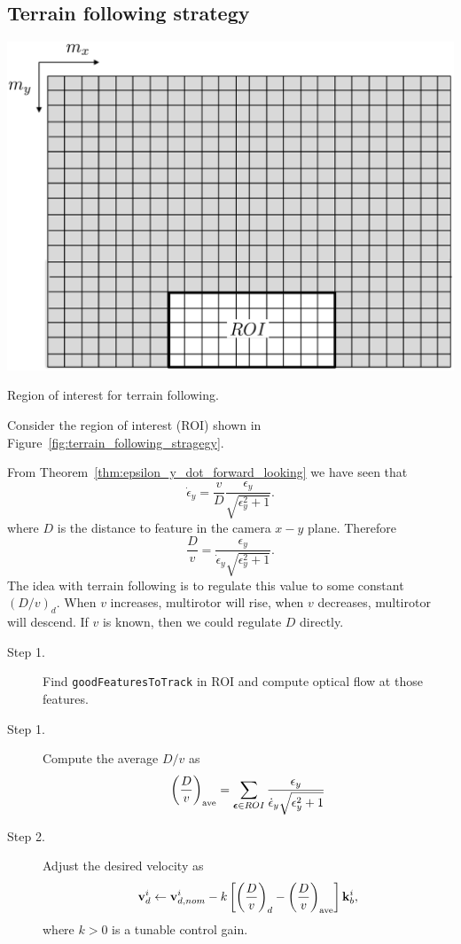\subsection{Terrain following strategy}


\begin{marginfigure}
	\includegraphics[width=\linewidth]{chap7_optical_flow/figures/terrain_following_strategy}
	\caption{Region of interest for terrain following.}
	\label{fig:terrain_following_stragegy}
\end{marginfigure}  

Consider the region of interest (ROI) shown in Figure~\ref{fig:terrain_following_stragegy}.


From Theorem~\ref{thm:epsilon_y_dot_forward_looking} we have seen that 
\[
	\dot{\epsilon}_y = \frac{v}{D}\frac{\epsilon_y}{\sqrt{\epsilon_y^2+1}}.
\]
where $D$ is the distance to feature in the camera $x-y$ plane.  Therefore
\[
\frac{D}{v} = \frac{\epsilon_y}{\dot{\epsilon}_y\sqrt{\epsilon_y^2+1}}.
\]
The idea with terrain following is to regulate this value to some constant $(D/v)_d$. When $v$ increases, multirotor will rise, when $v$ decreases, multirotor will descend.  If $v$ is known, then we could regulate $D$ directly.  

\begin{description}
	\item[Step 1.] Find \texttt{goodFeaturesToTrack} in ROI and compute optical flow at those features.
	\item[Step 1.]  Compute the average $D/v$ as
		\[
		\left(\frac{D}{v}\right)_{\text{ave}} = \sum_{\boldsymbol{\epsilon}\in ROI} \frac{\epsilon_y}{\dot{\epsilon}_y\sqrt{\epsilon_y^2+1}}
		\]
	\item[Step 2.] Adjust the desired velocity as
		\[
		\mathbf{v}_d^i \leftarrow \mathbf{v}_{d,nom}^i - k\left[\left(\frac{D}{v}\right)_d - \left(\frac{D}{v}\right)_{\text{ave}}\right] \mathbf{k}_b^i,
		\]
		where $k>0$ is a tunable control gain.
\end{description}


